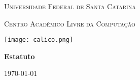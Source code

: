 \begin{titlepage}
	\centering
	{\scshape\Large Universidade Federal de Santa Catarina\par}
    \vspace{1cm}
	{\scshape\huge Centro Acadêmico Livre da Computação \par}
	
	\vspace{2cm}
	
	\texttt{[image: calico.png]}
	
	\vspace{2cm}
	{\huge\bfseries Estatuto\par}

	\vfill

	{\large \today\par}
\end{titlepage}
